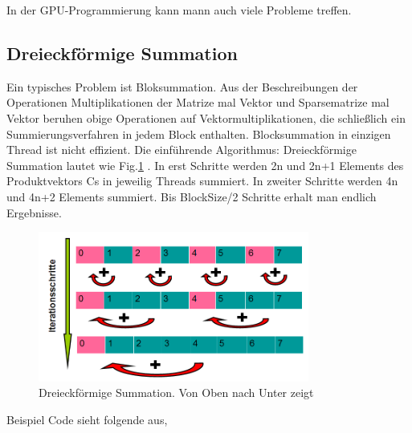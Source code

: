 
In der GPU-Programmierung kann mann auch viele Probleme treffen.

\subsection{Dreieckförmige Summation}
Ein typisches Problem ist Bloksummation. Aus der Beschreibungen der Operationen Multiplikationen der Matrize mal Vektor und Sparsematrize  mal Vektor beruhen obige Operationen auf Vektormultiplikationen, die schließlich ein Summierungsverfahren in jedem Block enthalten. Blocksummation in einzigen Thread ist nicht effizient. Die einführende Algorithmus: Dreieckförmige Summation lautet wie Fig.\ref{Dreieck} . In erst Schritte werden 2n und 2n+1 Elements des Produktvektors Cs in jeweilig Threads summiert. In zweiter Schritte werden 4n und 4n+2 Elements summiert. Bis BlockSize/2 Schritte erhalt man endlich Ergebnisse. 

\begin{figure}[htbp]
\includegraphics[width=3.5in]{.//pic//dreieck}
\caption{\label{Dreieck}Dreieckförmige Summation. Von Oben nach Unter zeigt}
\end{figure}

Beispiel Code sieht folgende aus,


